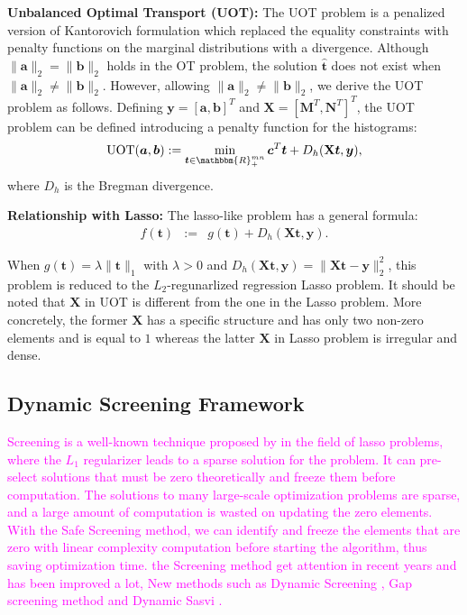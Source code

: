 \documentclass[twoside]{article}
\theoremstyle{plain}
\newcommand{\tranT}{T}
\newcommand{\R}{\mathbbm{R}}
\newcommand{\mat}[1]{\mathbf{#1}}
\renewcommand{\vec}[1]{\bm{#1}}
\newcommand{\note}[1]{\textcolor{magenta}{#1}}
\begin{document}
{\bf Unbalanced Optimal Transport (UOT):} The UOT problem is a penalized version of Kantorovich formulation which replaced the equality constraints with penalty functions on the marginal distributions with a divergence. 
Although $\|\vec{a}\|_2 = \|\vec{b}\|_2$ holds in the OT problem, the solution $\hat{\vec{t}}$ does not exist when $\|\vec{a}\|_2 \neq \|\vec{b}\|_2$. However, allowing $\|\vec{a}\|_2 \neq \|\vec{b}\|_2$, we derive the UOT problem as follows. Defining $\vec{y} = [\vec{a}, \vec{b}]^{\tranT}$ and $\mat{X} = [\mat{M}^{\tranT},\mat{N}^{\tranT}]^{\tranT}$, the UOT problem can be defined introducing a penalty function for the histograms: 
\begin{equation}
\label{eq:uot}
\operatorname{UOT}(\vec{a},\vec{b}) := \min_{\vec{t} \in \R_{+}^{mn}} \vec{c}^{\tranT}\vec{t} + D_h(\mat{X}\vec{t},\vec{y}),
\end{equation}
where $D_h$ is the Bregman divergence. 

{\bf Relationship with Lasso:} 
The lasso-like problem has a general formula:
%
\begin{eqnarray}
f(\vec{t}) &:=& g(\vec{t}) + D_h(\mat{X} \vec{t},\vec{y}).
\end{eqnarray}

When $g(\vec{t}) = \lambda \|\vec{t}\|_1$ with $\lambda > 0$ and $D_h(\mat{X} \vec{t},\vec{y}) = \|\mat{X} \vec{t}-\vec{y}\|_2^2$, this problem is reduced to the $L_2$-regunarlized regression Lasso problem. It should be noted that $\mat{X}$ in UOT is different from the one in the Lasso problem. More concretely, the former $\mat{X}$ has a specific structure and has only two non-zero elements and is equal to $1$ whereas the latter $\mat{X}$ in Lasso problem is irregular and dense.


\subsection{Dynamic Screening Framework}

\note{Screening is a well-known technique proposed by \citep{ghaoui2010safe} in the field of lasso problems, where the $L_1$ regularizer leads to a sparse solution for the problem. It can pre-select solutions that must be zero theoretically and freeze them before computation. The solutions to many large-scale optimization problems are sparse, and a large amount of computation is wasted on updating the zero elements. With the Safe Screening method, we can identify and freeze the elements that are zero with linear complexity computation before starting the algorithm, thus saving optimization time. the Screening method get attention in recent years and has been improved a lot, New methods such as Dynamic Screening \citep{7128732}, Gap screening method \citep{JMLR:v18:16-577} and Dynamic Sasvi \citep{NEURIPS2021_7b5b23f4}.}
\end{document}

